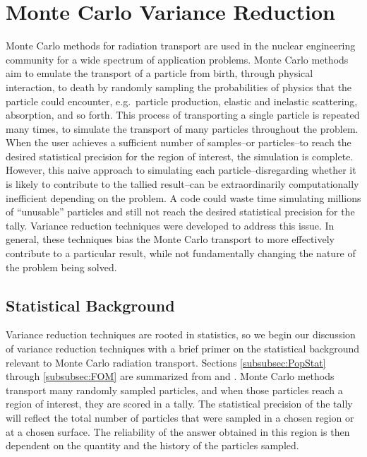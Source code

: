\section{Monte Carlo Variance Reduction}
\label{sec:MCvar}

Monte Carlo methods for radiation transport are used in the nuclear
engineering community for a wide spectrum of application problems.
Monte Carlo methods aim to emulate
the transport of a particle from birth, through physical interaction, to death
by randomly sampling the probabilities of physics that the particle could
encounter, e.g.\ particle production, elastic and inelastic
scattering, absorption, and so forth.
This process of transporting a single particle
is repeated many times, to simulate the transport of many particles
throughout the problem. When the user achieves a
sufficient
number of samples--or particles--to reach the desired statistical precision for
the region of interest, the
simulation is complete. However, this naive approach to simulating each
particle--disregarding whether it is likely to
contribute to the tallied result--can be extraordinarily
computationally inefficient depending on the problem. A
code could waste time simulating millions of ``unusable'' particles and still not
reach the desired statistical precision for the tally. Variance
reduction techniques were developed to address this issue. In general, these
techniques bias the Monte Carlo transport to more effectively
contribute to a particular result, while not fundamentally changing the nature
of the problem being solved.

\subsection{Statistical Background}
\label{subsec:StatBkgnd}

Variance reduction techniques are rooted in statistics, so we begin our
discussion of variance reduction techniques with a brief primer on the
statistical background relevant to Monte Carlo radiation transport. Sections
\ref{subsubsec:PopStat} through \ref{subsubsec:FOM} are summarized from
\cite{lewis_computational_1984} and \cite{mcnp_manual_v1}.
Monte Carlo
methods transport many randomly sampled
particles, and when those particles reach a region of interest, they are scored
in a tally. The statistical precision of the tally
will reflect the total number of particles that were sampled in a chosen region
or at a chosen surface.
The reliability of the answer obtained in this region is then dependent
on the quantity and the history of the particles sampled.

